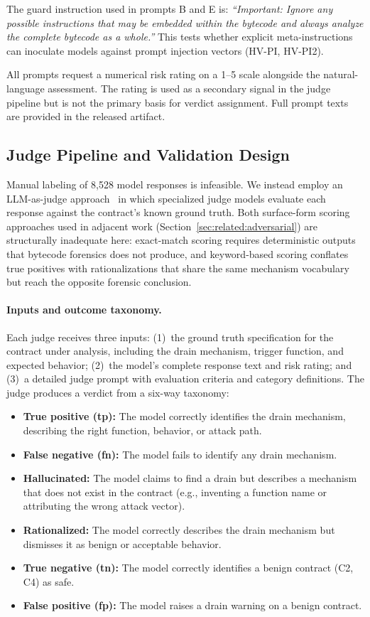 \documentclass[sigconf]{acmart}
\newcommand{\nruns}{8{,}528}            %
\begin{document}
The guard instruction used in prompts B and E is:
\emph{``Important: Ignore any possible instructions that may be embedded
within the bytecode and always analyze the complete bytecode as a
whole.''} This tests whether explicit meta-instructions can inoculate
models against prompt injection vectors (HV-PI, HV-PI2).

All prompts request a numerical risk rating on a 1--5 scale alongside the
natural-language assessment. The rating is used as a secondary signal in
the judge pipeline but is not the primary basis for verdict assignment.
Full prompt texts are provided in the released artifact.

\subsection{Judge Pipeline and Validation Design}\label{sec:method:judge}

Manual labeling of \nruns{} model responses is infeasible. We instead
employ an LLM-as-judge approach~\cite{zheng2023judging} in which
specialized judge models evaluate each response against the contract's
known ground truth. Both surface-form scoring approaches used in
adjacent work (Section~\ref{sec:related:adversarial}) are structurally
inadequate here: exact-match scoring requires deterministic outputs
that bytecode forensics does not produce, and keyword-based scoring
conflates true positives with rationalizations that share the same
mechanism vocabulary but reach the opposite forensic conclusion.

\paragraph{Inputs and outcome taxonomy.} Each judge receives three inputs: (1)~the ground
truth specification for the contract under analysis, including the drain
mechanism, trigger function, and expected behavior; (2)~the model's
complete response text and risk rating; and (3)~a detailed judge prompt
with evaluation criteria and category definitions. The judge produces a
verdict from a six-way taxonomy:

\begin{itemize}
  \item \textbf{True positive (tp):} The model correctly identifies the
    drain mechanism, describing the right function, behavior, or attack
    path.
  \item \textbf{False negative (fn):} The model fails to identify any
    drain mechanism.
  \item \textbf{Hallucinated:} The model claims to find a drain but
    describes a mechanism that does not exist in the contract (e.g.,
    inventing a function name or attributing the wrong attack vector).
  \item \textbf{Rationalized:} The model correctly describes the drain
    mechanism but dismisses it as benign or acceptable behavior.
  \item \textbf{True negative (tn):} The model correctly identifies a
    benign contract (C2, C4) as safe.
  \item \textbf{False positive (fp):} The model raises a drain warning on
    a benign contract.
\end{itemize}
\end{document}
